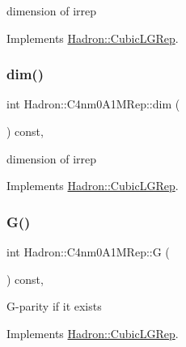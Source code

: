 dimension of irrep 

Implements \mbox{\hyperlink{structHadron_1_1CubicLGRep_a3acbaea26503ed64f20df693a48e4cdd}{Hadron\+::\+Cubic\+L\+G\+Rep}}.

\mbox{\label{structHadron_1_1C4nm0A1MRep_ae62b548a67faabb6850b1fc035815dc4}} 
\subsubsection{\texorpdfstring{dim()}{dim()}\hspace{0.1cm}{\footnotesize\ttfamily [2/2]}}
{\footnotesize\ttfamily int Hadron\+::\+C4nm0\+A1\+M\+Rep\+::dim (\begin{DoxyParamCaption}{ }\end{DoxyParamCaption}) const\hspace{0.3cm}{\ttfamily [inline]}, {\ttfamily [virtual]}}

dimension of irrep 

Implements \mbox{\hyperlink{structHadron_1_1CubicLGRep_a3acbaea26503ed64f20df693a48e4cdd}{Hadron\+::\+Cubic\+L\+G\+Rep}}.

\mbox{\label{structHadron_1_1C4nm0A1MRep_a4b8cedc0bf2a2c77a259d33915be1ab9}} 
\subsubsection{\texorpdfstring{G()}{G()}\hspace{0.1cm}{\footnotesize\ttfamily [1/2]}}
{\footnotesize\ttfamily int Hadron\+::\+C4nm0\+A1\+M\+Rep\+::G (\begin{DoxyParamCaption}{ }\end{DoxyParamCaption}) const\hspace{0.3cm}{\ttfamily [inline]}, {\ttfamily [virtual]}}

G-\/parity if it exists 

Implements \mbox{\hyperlink{structHadron_1_1CubicLGRep_ace26f7b2d55e3a668a14cb9026da5231}{Hadron\+::\+Cubic\+L\+G\+Rep}}.

\mbox{\label{structHadron_1_1C4nm0A1MRep_a4b8cedc0bf2a2c77a259d33915be1ab9}} 
